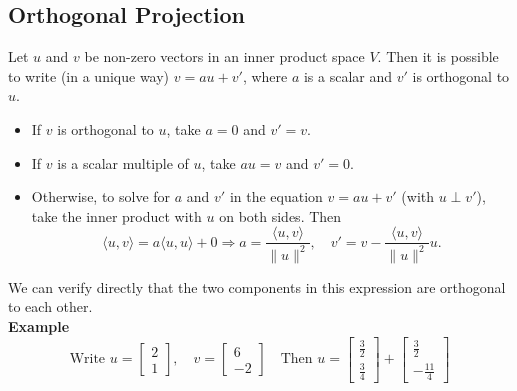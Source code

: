 \documentclass[a4paper, 9pt]{extarticle}
\begin{document}
\subsection{Orthogonal Projection}
\begin{lemmabox}{}{}
  Let $u$ and $v$ be non-zero vectors in an inner product space $V$.
  Then it is possible to write (in a unique way) $v = au + v'$, where $a$ is a scalar and $v'$ is orthogonal to $u$.
\end{lemmabox}

\begin{itemize}
  \item If $v$ is orthogonal to $u$, take $a = 0$ and $v' = v$.

  \item If $v$ is a scalar multiple of $u$, take $au = v$ and $v' = 0$.

  \item Otherwise, to solve for $a$ and $v'$ in the equation $v = au + v'$ (with $u \perp v'$), take the inner product with $u$ on both sides. Then
        $$
          \langle u, v \rangle = a \langle u, u \rangle + 0 \Longrightarrow a = \frac{\langle u, v \rangle}{\|u\|^2}, \quad
          v' = v - \frac{\langle u, v \rangle}{\|u\|^2} u.
        $$
\end{itemize}
We can verify directly that the two components in this expression are orthogonal to each other. \\[2ex]
\noindent \textbf{Example}
$$\text{Write } u = \begin{bmatrix} 2 \\ 1 \end{bmatrix},\quad v = \begin{bmatrix} 6 \\ -2 \end{bmatrix} \quad \text{Then } u = \begin{bmatrix} \frac{3}{2} \\ \frac{3}{4} \end{bmatrix} + \begin{bmatrix} \frac{3}{2} \\ -\frac{11}{4} \end{bmatrix}$$
\end{document}

